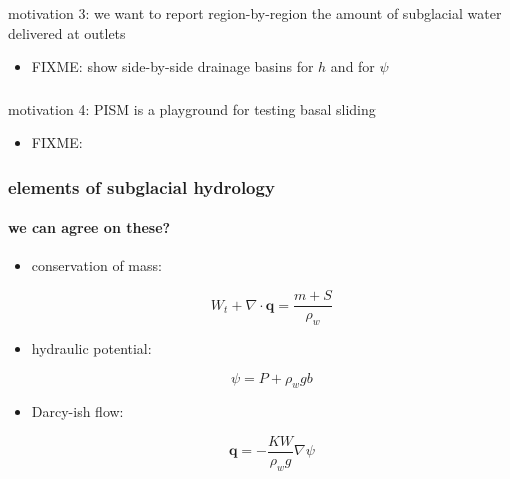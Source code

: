 \documentclass[hide notes,intlimits]{beamer}
\begin{document}
\begin{frame}
  \frametitle{\whytitle}
  
\begin{center}
  motivation 3: we want to report region-by-region the amount of subglacial water delivered at outlets
\end{center}
  
  \begin{itemize}
    \item FIXME: show side-by-side drainage basins for $h$ and for $\psi$
  \end{itemize}

\end{frame}


\begin{frame}
  \frametitle{\whytitle}
  
\begin{center}
  motivation 4: PISM is a playground for testing basal sliding
\end{center}
  
  \begin{itemize}
    \item FIXME: 
  \end{itemize}

\end{frame}


\begin{frame}
  \frametitle{elements of subglacial hydrology}
  \framesubtitle{we can agree on these?}

\newcommand{\bq}{\mathbf{q}}

  \begin{itemize}
    \item conservation of mass:
    
    $$W_t + \nabla \cdot \bq = \frac{m + S}{\rho_w}$$

    \item hydraulic potential:
    
    $$\psi = P + \rho_w g b$$

    \item Darcy-ish flow:
    
    $$\bq = - \frac{K W}{\rho_w g} \nabla \psi $$
  \end{itemize}

\end{frame}
\end{document}

